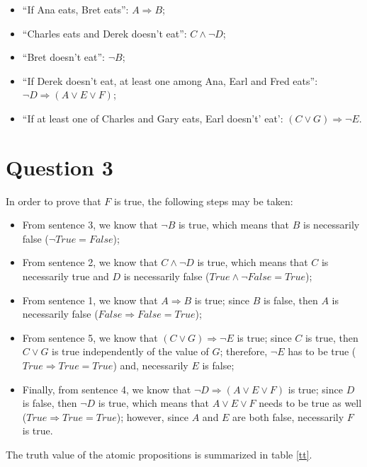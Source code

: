\documentclass[letterpaper,headings=standardclasses]{scrartcl}
\begin{document}
\begin{itemize}
    \item ``If Ana eats, Bret eats'': $A \Rightarrow B$;
    \item ``Charles eats and Derek doesn't eat'': $C \wedge \neg D$;
    \item ``Bret doesn't eat'': $\neg B$;
    \item ``If Derek doesn't eat, at least one among Ana, Earl and Fred eats'': $\neg D \Rightarrow (A \vee E \vee F)$;
    \item ``If at least one of Charles and Gary eats, Earl doesn't' eat': $(C \vee G) \Rightarrow \neg E$.
\end{itemize}

\section{Question 3}

In order to prove that $F$ is true, the following steps may be taken:

\begin{itemize}
    \item From sentence 3, we know that $\neg B$ is true, which means that $B$ is necessarily false ($\neg True = False$);
    \item From sentence 2, we know that $C \wedge \neg D$ is true, which means that $C$ is necessarily true and $D$ is necessarily false ($True \wedge \neg False = True$);
    \item From sentence 1, we know that $A \Rightarrow B$ is true; since $B$ is false, then $A$ is necessarily false ($False \Rightarrow False = True$);
    \item From sentence 5, we know that $(C \vee G) \Rightarrow \neg E$ is true; since $C$ is true, then $C \vee G$ is true independently of the value of $G$; therefore, $\neg E$ has to be true ($True \Rightarrow True = True$) and, necessarily $E$ is false;
    \item Finally, from sentence 4, we know that $\neg D \Rightarrow (A \vee E \vee F)$ is true; since $D$ is false, then $\neg D$ is true, which means that $A \vee E \vee F$ needs to be true as well ($True \Rightarrow True = True$); however, since $A$ and $E$ are both false, necessarily $F$ is true.
\end{itemize}

The truth value of the atomic propositions is summarized in table \ref{tt}.
\end{document}
